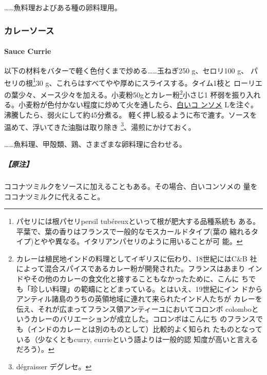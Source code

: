 \begin{recette}
\ldots{}\ldots{}魚料理およびある種の卵料理用。

\maeaki

\hypertarget{ux30abux30ecux30fcux30bdux30fcux30b9}{%
\subsubsection{カレーソース}\label{ux30abux30ecux30fcux30bdux30fcux30b9}}

\hypertarget{sauce-currie}{%
\paragraph{Sauce Currie}\label{sauce-currie}}


以下の材料をバターで軽く色付くまで炒める\ldots{}\ldots{}玉ねぎ250
g、セロリ100 g、 パセリの根\footnote{パセリには根パセリpersil
  tubéreuxといって根が肥大する品種系統も
  ある。平葉で、葉の香りはフランスで一般的なモスカールドタイプ(葉の
  縮れるタイプ)とやや異なる。イタリアンパセリのように用いることが可 能。}30
g、これらはすべてやや厚めにスライスする。タイム1枝と
ローリエの葉少々、メース少々を加える。小麦粉50gとカレー粉\footnote{カレーは植民地インドの料理としてイギリスに伝わり、18世紀にはC\&B
  社によって混合スパイスであるカレー粉が開発された。フランスはあまり
  インドやその他のカレーの食文化と接することもなかったために、こんに
  ちでも「珍しい料理」の範疇にとどまっている。とはいえ、19世紀にイン
  ドからアンティル諸島のうちの英領地域に連れて来られたインド人たちが
  カレーを伝え、それが広まってフランス領アンティーユにおいてコロンボ
  colomboというカレーのバリエーションが成立した。コロンボはこんにち
  のフランスでも（インドのカレーとは別のものとして）比較的よく知られ
  たものとなっている（少なくともcurry, currieという語よりは一般的認
  知度が高いと言えるだろう）。}小さじ1
杯弱を振り入れる。小麦粉が色付かない程度に炒めて火を通したら、\protect\hyperlink{}{白いコ
ンソメ} \troisquarts{} Lを注ぐ。沸騰したら、弱火にして約45分煮る。
軽く押し絞るように布で漉す。ソースを温めて、浮いてきた油脂は取り除き
\footnote{dégraisser デグレセ。}、湯煎にかけておく。

\ldots{}\ldots{}魚料理、甲殻類、鶏、さまざまな卵料理に合わせる。

\hypertarget{ux539fux6ce8-6}{%
\subparagraph{【原注】}\label{ux539fux6ce8-6}}

ココナツミルクをソースに加えることもある。その場合、白いコンソメの
\unquart{}量をココナツミルクに代えること。


\end{recette}
